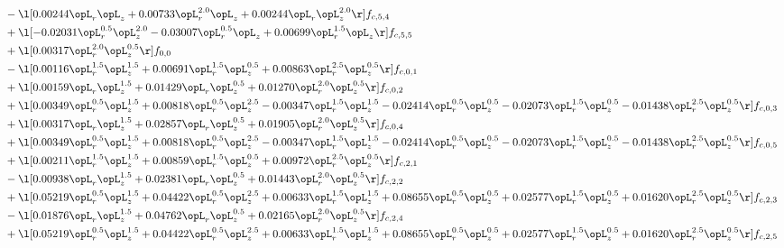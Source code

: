 \begin{alignat}{2}
& - \l[  0.00244 \opL_r \opL_z +  0.00733 \opL_r^{2.0} \opL_z +  0.00244 \opL_r \opL_z^{2.0}  \r] f_{c,5,4} \nonumber \\ 
& + \l[  -0.02031 \opL_r^{0.5} \opL_z^{2.0}   -0.03007 \opL_r^{0.5} \opL_z +  0.00699 \opL_r^{1.5} \opL_z  \r] f_{c,5,5} \nonumber \\ 
& + \l[  0.00317 \opL_r^{2.0} \opL_z^{0.5}  \r] f_{0,0} \nonumber \\ 
& - \l[  0.00116 \opL_r^{1.5} \opL_z^{1.5} +  0.00691 \opL_r^{1.5} \opL_z^{0.5} +  0.00863 \opL_r^{2.5} \opL_z^{0.5}  \r] f_{c,0,1} \nonumber \\ 
& + \l[  0.00159 \opL_r \opL_z^{1.5} +  0.01429 \opL_r \opL_z^{0.5} +  0.01270 \opL_r^{2.0} \opL_z^{0.5}  \r] f_{c,0,2} \nonumber \\ 
& + \l[  0.00349 \opL_r^{0.5} \opL_z^{1.5} +  0.00818 \opL_r^{0.5} \opL_z^{2.5}   -0.00347 \opL_r^{1.5} \opL_z^{1.5}   -0.02414 \opL_r^{0.5} \opL_z^{0.5}   -0.02073 \opL_r^{1.5} \opL_z^{0.5}   -0.01438 \opL_r^{2.5} \opL_z^{0.5}  \r] f_{c,0,3} \nonumber \\ 
& + \l[  0.00317 \opL_r \opL_z^{1.5} +  0.02857 \opL_r \opL_z^{0.5} +  0.01905 \opL_r^{2.0} \opL_z^{0.5}  \r] f_{c,0,4} \nonumber \\ 
& + \l[  0.00349 \opL_r^{0.5} \opL_z^{1.5} +  0.00818 \opL_r^{0.5} \opL_z^{2.5}   -0.00347 \opL_r^{1.5} \opL_z^{1.5}   -0.02414 \opL_r^{0.5} \opL_z^{0.5}   -0.02073 \opL_r^{1.5} \opL_z^{0.5}   -0.01438 \opL_r^{2.5} \opL_z^{0.5}  \r] f_{c,0,5} \nonumber \\ 
& + \l[  0.00211 \opL_r^{1.5} \opL_z^{1.5} +  0.00859 \opL_r^{1.5} \opL_z^{0.5} +  0.00972 \opL_r^{2.5} \opL_z^{0.5}  \r] f_{c,2,1} \nonumber \\ 
& - \l[  0.00938 \opL_r \opL_z^{1.5} +  0.02381 \opL_r \opL_z^{0.5} +  0.01443 \opL_r^{2.0} \opL_z^{0.5}  \r] f_{c,2,2} \nonumber \\ 
& + \l[  0.05219 \opL_r^{0.5} \opL_z^{1.5} +  0.04422 \opL_r^{0.5} \opL_z^{2.5} +  0.00633 \opL_r^{1.5} \opL_z^{1.5} +  0.08655 \opL_r^{0.5} \opL_z^{0.5} +  0.02577 \opL_r^{1.5} \opL_z^{0.5} +  0.01620 \opL_r^{2.5} \opL_z^{0.5}  \r] f_{c,2,3} \nonumber \\ 
& - \l[  0.01876 \opL_r \opL_z^{1.5} +  0.04762 \opL_r \opL_z^{0.5} +  0.02165 \opL_r^{2.0} \opL_z^{0.5}  \r] f_{c,2,4} \nonumber \\ 
& + \l[  0.05219 \opL_r^{0.5} \opL_z^{1.5} +  0.04422 \opL_r^{0.5} \opL_z^{2.5} +  0.00633 \opL_r^{1.5} \opL_z^{1.5} +  0.08655 \opL_r^{0.5} \opL_z^{0.5} +  0.02577 \opL_r^{1.5} \opL_z^{0.5} +  0.01620 \opL_r^{2.5} \opL_z^{0.5}  \r] f_{c,2,5} \nonumber \\ 

\end{alignat}
